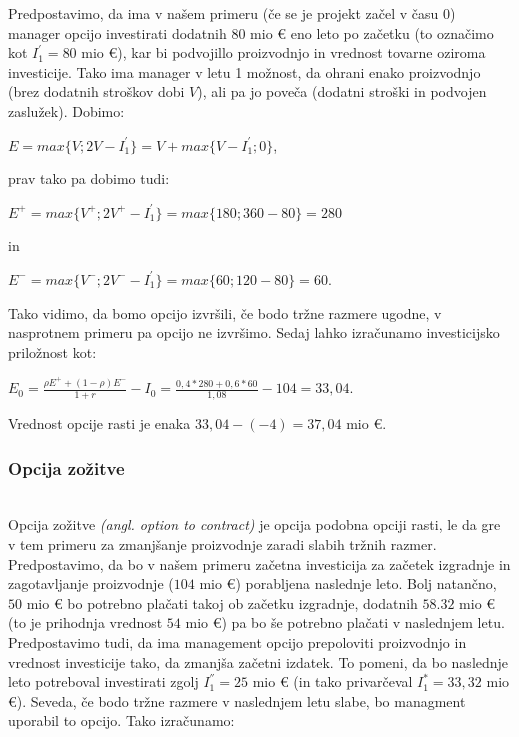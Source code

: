 Predpostavimo, da ima v našem primeru (če se je projekt začel v času 0) manager opcijo investirati dodatnih $80$ mio € eno leto po začetku (to označimo kot $I^'_1 = 80$ mio €), kar bi podvojillo proizvodnjo in vrednost tovarne oziroma investicije. Tako ima manager v letu 1 možnost, da ohrani enako proizvodnjo (brez dodatnih stroškov dobi $V$), ali pa jo poveča (dodatni stroški in podvojen zaslužek). Dobimo:\\

 \begin{center}
$E = max\{V; 2V - I^'_1\} = V + max\{V - I^'_1; 0\}$,
\end{center}
prav tako pa dobimo tudi:\\
\begin{center}
$E^+ = max\{V^+; 2V^+ - I^'_1\} =  max\{180; 360 - 80\} = 280$
\end{center}
in
\begin{center}
$E^- = max\{V^-; 2V^- - I^'_1\} =  max\{60; 120 - 80\} = 60$.
\end{center}

Tako vidimo, da bomo opcijo izvršili, če bodo tržne razmere ugodne, v nasprotnem primeru pa opcijo ne izvršimo. Sedaj lahko izračunamo investicijsko priložnost kot:
\begin{center}
$E_0 = \tfrac{\rho E^+ + (1-\rho)E^-}{1+r} - I_0= \tfrac{0,4 * 280 + 0,6 * 60}{1,08} - 104 = 33,04 $.
\end{center}
Vrednost opcije rasti je enaka $33,04-(-4)=37,04$ mio €.\\

\subsubsection{Opcija zožitve}
\cite[str. 163, 164]{Trigeorgis}\\
Opcija zožitve \textit{(angl. option to contract)} je opcija podobna opciji rasti, le da gre v tem primeru za zmanjšanje proizvodnje zaradi slabih tržnih razmer. \\

Predpostavimo, da bo v našem primeru začetna investicija za začetek izgradnje in zagotavljanje proizvodnje ($104$ mio €) porabljena naslednje leto. Bolj natančno, $50$ mio € bo potrebno plačati takoj ob začetku izgradnje, dodatnih $58.32$ mio € (to je prihodnja vrednost $54$ mio €) pa bo še potrebno plačati v naslednjem letu. Predpostavimo tudi, da ima management opcijo  prepoloviti proizvodnjo in vrednost investicije tako, da zmanjša začetni izdatek. To pomeni, da bo naslednje leto potreboval investirati zgolj $I^{''}_1 = 25$ mio € (in tako privarčeval $I^*_1 = 33,32$ mio €). Seveda, če bodo tržne razmere v naslednjem letu slabe, bo managment uporabil to opcijo. Tako izračunamo:\\

